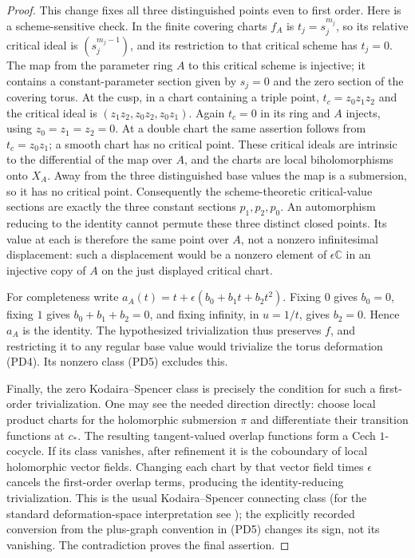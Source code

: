 \begin{proof}
This change fixes all three distinguished points even to first order.
Here is a scheme-sensitive check. In the finite covering charts
$f_A$ is $t_j=s_j^{m_j}$, so its relative critical ideal is
$(s_j^{m_j-1})$, and its restriction to that critical scheme has
$t_j=0$. The map from the parameter ring $A$ to this critical
scheme is injective; it contains a constant-parameter section given
by $s_j=0$ and the zero section of the covering torus.
At the cusp, in a chart containing a triple point,
$t_c=z_0z_1z_2$ and the critical ideal is
$(z_1z_2,z_0z_2,z_0z_1)$. Again $t_c=0$ in its ring and $A$ injects,
using $z_0=z_1=z_2=0$. At a double chart the same assertion follows
from $t_c=z_0z_1$; a smooth chart has no critical point.
These critical ideals are intrinsic to the differential of the map
over $A$, and the charts are local biholomorphisms onto $X_A$.
Away from the three distinguished base values the map is a
submersion, so it has no critical point.
Consequently the scheme-theoretic critical-value sections are exactly
the three constant sections $p_1,p_2,p_0$. An automorphism reducing
to the identity cannot permute these three distinct closed points.
Its value at each is therefore the same point over $A$, not a
nonzero infinitesimal displacement: such a displacement would be a
nonzero element of $\epsilon\mathbb C$ in an injective copy of $A$
on the just displayed critical chart.

For completeness write $a_A(t)=t+\epsilon(b_0+b_1t+b_2t^2)$.
Fixing $0$ gives $b_0=0$, fixing $1$ gives $b_0+b_1+b_2=0$,
and fixing infinity, in $u=1/t$, gives $b_2=0$.
Hence $a_A$ is the identity. The hypothesized trivialization thus
preserves $f$, and restricting it to any regular base value would
trivialize the torus deformation (PD4). Its nonzero class (PD5)
excludes this.

Finally, the zero Kodaira--Spencer class is precisely the condition for
such a first-order trivialization. One may see the needed direction
directly: choose local product charts for the holomorphic submersion
$\pi$ and differentiate their transition functions at $c_*$. The
resulting tangent-valued overlap functions form a Cech $1$-cocycle.
If its class vanishes, after refinement it is the coboundary of local
holomorphic vector fields. Changing each chart by that vector field
times $\epsilon$ cancels the first-order overlap terms, producing
the identity-reducing trivialization. This is the usual
Kodaira--Spencer connecting class (for the standard deformation-space
interpretation see \cite[Section~67, p.~15]{McMullen1996Complex});
the explicitly recorded conversion
from the plus-graph convention in (PD5) changes its sign, not its
vanishing. The contradiction proves the final assertion.
\end{proof}

